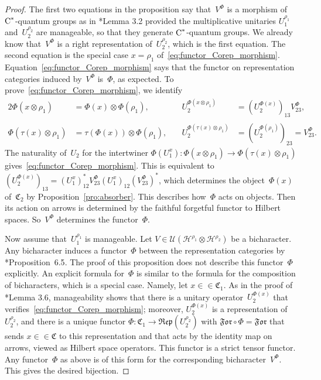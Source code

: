 \documentclass[a4paper]{amsart}
\numberwithin{equation}{section}
\theoremstyle{plain}
\numberwithin{theorem}{section}
\theoremstyle{definition}
\theoremstyle{remark}
\newcommand*{\inOb}{\mathrel{\in\in}}%
\newcommand*{\Cat}{\mathfrak C}     %
\newcommand*{\Corepcat}[1]{\mathfrak{Rep}(#1)}%
\newcommand*{\Forget}{\mathfrak{For}}%
\newcommand*{\Trivial}{\tau}%
\newcommand*{\nb}{\nobreakdash}
\newcommand*{\Cst}{\textup C^*}%
\newcommand*{\Hils}[1][H]{\mathcal{#1}}%
\newcommand*{\U}{\mathcal U}%
\begin{document}
\begin{proof}
  The first two equations in the proposition say that~\(V^\Phi\)
  is a morphism of \(\Cst\)\nb-quantum
  groups as in \cite{Meyer-Roy-Woronowicz:Homomorphisms}*{Lemma 3.2}
  provided the multiplicative unitaries \(U_1^{\rho_1}\)
  and~\(U_2^{\rho_2}\)
  are manageable, so that they generate \(\Cst\)\nb-quantum
  groups.  We already know that~\(V^\Phi\)
  is a right representation of~\(U_2^{\rho_2}\),
  which is the first equation.  The second equation is the special
  case \(x=\rho_1\)
  of~\eqref{eq:functor_Corep_morphism}.
  Equation~\ref{eq:functor_Corep_morphism} says that the functor on
  representation categories induced by~\(V^\Phi\)
  is~\(\Phi\),
  as expected.  To prove~\eqref{eq:functor_Corep_morphism}, we
  identify
  \begin{alignat*}{2}
    \Phi(x \otimes\rho_1) &= \Phi(x) \otimes\Phi(\rho_1),&\quad
    U_2^{\Phi(x \otimes\rho_1)} &=
    (U_2^{\Phi(x)})^{\phantom1}_{13} V^{\Phi}_{23},\\
    \Phi(\Trivial(x) \otimes\rho_1) &= \Trivial(\Phi(x))
    \otimes\Phi(\rho_1),&\quad
    U_2^{\Phi(\Trivial(x) \otimes\rho_1)} &=
    (U_2^{\Phi(\rho_1)})^{\phantom1}_{23} = V^{\Phi}_{23}.
  \end{alignat*}
  The naturality of~\(U_2\)
  for the intertwiner
  \(\Phi(U_1^x)\colon \Phi(x \otimes\rho_1) \to \Phi(\Trivial(x)
  \otimes\rho_1)\)
  gives~\eqref{eq:functor_Corep_morphism}.  This is equivalent to
  \((U_2^{\Phi(x)})^{\phantom1}_{13} = (U_1^x)_{12}^{*\phantom1}
  V^\Phi_{23} (U_1^x)^{\phantom1}_{12} (V^\Phi_{23})^*\),
  which determines the object~\(\Phi(x)\)
  of~\(\Cat_2\)
  by Proposition~\ref{pro:absorber}.  This describes how~\(\Phi\)
  acts on objects.  Then its action on arrows is determined by the
  faithful forgetful functor to Hilbert spaces.  So~\(V^\Phi\)
  determines the functor~\(\Phi\).

  Now assume that~\(U_1^{\rho_1}\)
  is manageable.  Let \(V\in \U(\Hils^{\rho_1}\otimes\Hils^{\rho_2})\)
  be a bicharacter.  Any bicharacter induces a functor~\(\Phi\)
  between the representation categories by
  \cite{Meyer-Roy-Woronowicz:Homomorphisms}*{Proposition~6.5}.  The
  proof of this proposition does not describe this functor~\(\Phi\)
  explicitly.  An explicit formula for~\(\Phi\)
  is similar to the formula for the composition of bicharacters, which
  is a special case.  Namely, let \(x\inOb\Cat_1\).
  As in the proof of \cite{Meyer-Roy-Woronowicz:Homomorphisms}*{Lemma
    3.6}, manageability shows that there is a unitary
  operator~\(U_2^{\Phi(x)}\)
  that verifies~\eqref{eq:functor_Corep_morphism}; moreover,
  \(U_2^{\Phi(x)}\)
  is a representation of~\(U_2^{\rho_2}\),
  and there is a unique functor
  \(\Phi\colon \Cat_1 \to \Corepcat{U_2^{\rho_2}}\)
  with \(\Forget\circ\Phi=\Forget\)
  that sends \(x\inOb\Cat\)
  to this representation and that acts by the identity map on arrows,
  viewed as Hilbert space operators.  This functor is a strict tensor
  functor.  Any functor~\(\Phi\)
  as above is of this form for the corresponding bicharacter~\(V^\Phi\).
  This gives the desired bijection.
\end{proof}
\end{document}
